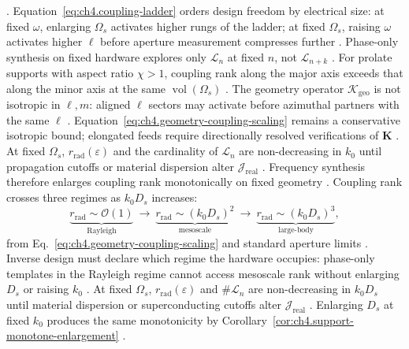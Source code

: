 \cite{stratton1941}. Equation~\eqref{eq:ch4.coupling-ladder} orders design freedom by electrical
size: at fixed \(\omega\), enlarging \(\Omega_{s}\) activates higher rungs of the ladder; at fixed \(\Omega_{s}\), raising
\(\omega\) activates higher \(\ell\) before aperture measurement compresses further \cite{devaney2004}.
Phase-only synthesis on fixed hardware explores only \(\mathcal{L}_{n}\) at fixed \(n\), not \(\mathcal{L}_{n+k}\)
\cite{stratton1941}.
For prolate supports with aspect ratio \(\chi>1\), coupling rank along the major axis exceeds that along the minor axis
at the same \(\operatorname{vol}(\Omega_{s})\) \cite{stratton1941}. The geometry operator
\(\boldsymbol{\mathcal{K}}_{\mathrm{geo}}\) is not isotropic in \(\ell,m\): aligned \(\ell\) sectors may activate before
azimuthal partners with the same \(\ell\) \cite{harrington2001}. Equation~\eqref{eq:ch4.geometry-coupling-scaling}
remains a conservative isotropic bound; elongated feeds require directionally resolved verifications of \(\mathbf{K}\)
\cite{devaney2004}.
\label{lem:ch4.coupling-freq-monotone}
At fixed \(\Omega_{s}\), \(r_{\mathrm{rad}}(\varepsilon)\) and the cardinality of \(\mathcal{L}_{n}\) are
non-decreasing in \(k_{0}\) until propagation cutoffs or material dispersion alter \(\mathcal{J}_{\mathrm{real}}\)
\cite{stratton1941}. Frequency synthesis therefore enlarges coupling rank monotonically on fixed
geometry \cite{harrington2001}.
Coupling rank crosses three regimes as \(k_{0}D_{s}\) increases:
\begin{equation}
\label{eq:ch4.coupling-crossover}
\underbrace{r_{\mathrm{rad}}\sim\mathcal{O}(1)}_{\text{Rayleigh}}
\ \longrightarrow\
\underbrace{r_{\mathrm{rad}}\sim(k_{0}D_{s})^{2}}_{\text{mesoscale}}
\ \longrightarrow\
\underbrace{r_{\mathrm{rad}}\sim(k_{0}D_{s})^{3}}_{\text{large-body}},
\end{equation}
from Eq.~\eqref{eq:ch4.geometry-coupling-scaling} and standard aperture limits
\cite{stratton1941}. Inverse design must declare which regime the hardware occupies:
phase-only templates in the Rayleigh regime cannot access mesoscale rank without enlarging \(D_{s}\) or raising \(k_{0}\)
\cite{devaney2004}.
\phantomsection\label{prop:ch4.crossover-monotone}
At fixed \(\Omega_{s}\), \(r_{\mathrm{rad}}(\varepsilon)\) and \(\#\mathcal{L}_{n}\) are non-decreasing in \(k_{0}D_{s}\) until
material dispersion or superconducting cutoffs alter \(\mathcal{J}_{\mathrm{real}}\) \cite{stratton1941}.
Enlarging \(D_{s}\) at fixed \(k_{0}\) produces the same monotonicity by
Corollary~\ref{cor:ch4.support-monotone-enlargement} \cite{harrington2001}.
